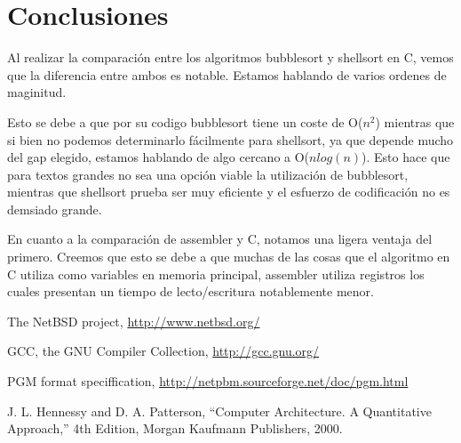 \documentclass{article}
\begin{document}
\newpage

\section{Conclusiones}

	Al realizar la comparación entre los algoritmos bubblesort y shellsort en C, vemos que la diferencia entre ambos es notable. Estamos hablando de varios ordenes de maginitud.
	\par
	Esto se debe a que por su codigo bubblesort tiene un coste de O($n^2$) mientras que si bien no podemos determinarlo fácilmente para shellsort, ya que depende mucho del gap elegido, estamos hablando de algo cercano a O($n log(n)$). Esto hace que para textos grandes no sea una opción viable la utilización de bubblesort, mientras que shellsort prueba ser muy eficiente y el esfuerzo de codificación no es demsiado grande.
	\par
	En cuanto a la comparación de assembler y C, notamos una ligera ventaja del primero. Creemos que esto se debe a que muchas de las cosas que el algoritmo en C utiliza como variables en memoria principal, assembler utiliza registros los cuales presentan un tiempo de lecto/escritura notablemente menor.
\bigskip\bigskip




\begin{thebibliography}{99}

	 The NetBSD project, \url{http://www.netbsd.org/}

	 GCC, the GNU Compiler Collection, \url{http://gcc.gnu.org/}

	 PGM format speciffication, \url{http://netpbm.sourceforge.net/doc/pgm.html}

	 J. L. Hennessy and D. A. Patterson, ``Computer Architecture. A Quantitative
	Approach,'' 4th Edition, Morgan Kaufmann Publishers, 2000.

	\end{thebibliography}

\newpage
\end{document}
